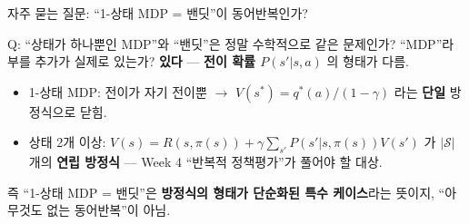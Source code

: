 \begin{frame}{자주 묻는 질문: ``1-상태 MDP = 밴딧''이 동어반복인가?}
  \begin{block}{Q: ``상태가 하나뿐인 MDP''와 ``밴딧''은 정말
  수학적으로 같은 문제인가? ``MDP''라 부를 추가가 실제로
  있는가?}
    \textbf{있다} --- \textbf{전이 확률 $P(s'|s,a)$} 의 형태가
    다름.
    \begin{itemize}
      \item 1-상태 MDP: 전이가 자기 전이뿐 $\to$
        $V(s^*) = q^*(a)/(1-\gamma)$ 라는 \textbf{단일} 방정식으로
        닫힘.
      \item 상태 2개 이상: $V(s) = R(s,\pi(s)) + \gamma\sum_{s'}
        P(s'|s,\pi(s)) V(s')$ 가 $|\mathcal{S}|$개의
        \textbf{연립 방정식} --- Week 4 ``반복적 정책평가''가
        풀어야 할 대상.
    \end{itemize}
    즉 ``1-상태 MDP = 밴딧''은 \textbf{방정식의 형태가 단순화된
    특수 케이스}라는 뜻이지, ``아무것도 없는 동어반복''이 아님.
  \end{block}
\end{frame}
